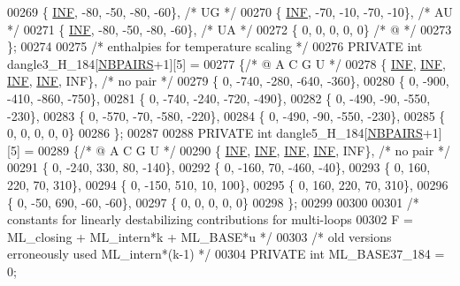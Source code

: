 \begin{DoxyCode}
00269    \{ \hyperlink{energy__const_8h_a12c2040f25d8e3a7b9e1c2024c618cb6}{INF},  -80,  -50,  -80,  -60\},  \textcolor{comment}{/* UG */}
00270    \{ \hyperlink{energy__const_8h_a12c2040f25d8e3a7b9e1c2024c618cb6}{INF},  -70,  -10,  -70,  -10\},  \textcolor{comment}{/* AU */}
00271    \{ \hyperlink{energy__const_8h_a12c2040f25d8e3a7b9e1c2024c618cb6}{INF},  -80,  -50,  -80,  -60\},  \textcolor{comment}{/* UA */}
00272    \{   0,    0,     0,    0,   0\}   \textcolor{comment}{/*  @ */}
00273 \};
00274 
00275 \textcolor{comment}{/* enthalpies for temperature scaling */}
00276 PRIVATE \textcolor{keywordtype}{int} dangle3\_H\_184[\hyperlink{energy__const_8h_a5e75221c779d618eab81e096f37e32ce}{NBPAIRS}+1][5] =
00277 \{\textcolor{comment}{/*   @     A     C     G     U   */}
00278    \{ \hyperlink{energy__const_8h_a12c2040f25d8e3a7b9e1c2024c618cb6}{INF},  \hyperlink{energy__const_8h_a12c2040f25d8e3a7b9e1c2024c618cb6}{INF},  \hyperlink{energy__const_8h_a12c2040f25d8e3a7b9e1c2024c618cb6}{INF},  \hyperlink{energy__const_8h_a12c2040f25d8e3a7b9e1c2024c618cb6}{INF},  INF\},  \textcolor{comment}{/* no pair */}
00279    \{   0, -740, -280, -640, -360\},
00280    \{   0, -900, -410, -860, -750\},
00281    \{   0, -740, -240, -720, -490\},
00282    \{   0, -490,  -90, -550, -230\},
00283    \{   0, -570,  -70, -580, -220\},
00284    \{   0, -490,  -90, -550, -230\},
00285    \{   0,    0,    0,    0,   0\}
00286 \};
00287 
00288 PRIVATE \textcolor{keywordtype}{int} dangle5\_H\_184[\hyperlink{energy__const_8h_a5e75221c779d618eab81e096f37e32ce}{NBPAIRS}+1][5] =
00289 \{\textcolor{comment}{/*   @     A     C     G     U   */}
00290    \{ \hyperlink{energy__const_8h_a12c2040f25d8e3a7b9e1c2024c618cb6}{INF},  \hyperlink{energy__const_8h_a12c2040f25d8e3a7b9e1c2024c618cb6}{INF},  \hyperlink{energy__const_8h_a12c2040f25d8e3a7b9e1c2024c618cb6}{INF},  \hyperlink{energy__const_8h_a12c2040f25d8e3a7b9e1c2024c618cb6}{INF},  INF\},  \textcolor{comment}{/* no pair */}
00291    \{   0, -240,  330,   80, -140\},
00292    \{   0, -160,   70, -460,  -40\},
00293    \{   0,  160,  220,   70,  310\},
00294    \{   0, -150,  510,   10,  100\},
00295    \{   0,  160,  220,   70,  310\},
00296    \{   0,  -50,  690,  -60,  -60\},
00297    \{   0,    0,    0,    0,   0\}
00298 \};
00299 
00300 
00301 \textcolor{comment}{/* constants for linearly destabilizing contributions for multi-loops}
00302 \textcolor{comment}{   F = ML\_closing + ML\_intern*k + ML\_BASE*u  */}
00303 \textcolor{comment}{/* old versions erroneously used ML\_intern*(k-1) */}
00304 PRIVATE \textcolor{keywordtype}{int} ML\_BASE37\_184 = 0;

\end{DoxyCode}

